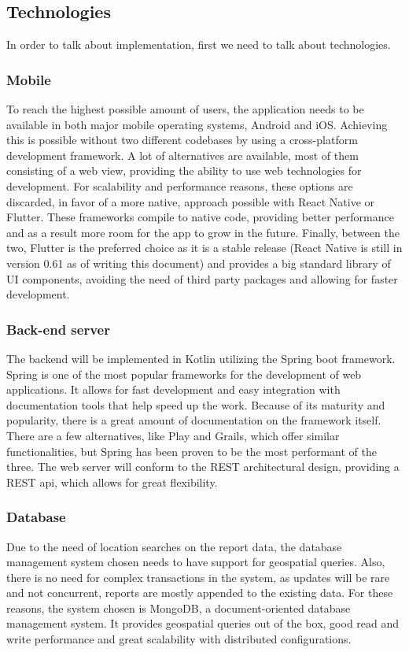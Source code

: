 \subsection{Technologies}
In order to talk about implementation, first we need to talk about technologies.

\subsubsection{Mobile}
To reach the highest possible amount of users, the application needs to be available in both major mobile operating systems, Android and iOS. Achieving this is possible without two different codebases by using a cross-platform development framework. A lot of alternatives are available, most of them consisting of a web view, providing the ability to use web technologies for development. For scalability and performance reasons, these options are discarded, in favor of a more native, approach possible with React Native or Flutter. These frameworks compile to native code, providing better performance and as a result more room for the app to grow in the future. Finally, between the two, Flutter is the preferred choice as it is a stable release (React Native is still in version 0.61 as of writing this document) and provides a big standard library of UI components, avoiding the need of third party packages and allowing for faster development.

\subsubsection{Back-end server}
The backend will be implemented in Kotlin utilizing the Spring boot framework. Spring is one of the most popular frameworks for the development of web applications. It allows for fast development and easy integration with documentation tools that help speed up the work. Because of its maturity and popularity, there is a great amount of documentation on the framework itself. There are a few alternatives, like Play and Grails, which offer similar functionalities, but Spring has been proven to be the most performant of the three.
The web server will conform to the REST architectural design, providing a REST api, which allows for great flexibility.

\subsubsection{Database}
Due to the need of location searches on the report data, the database management system chosen needs to have support for geospatial queries. Also, there is no need for complex transactions in the system, as updates will be rare and not concurrent, reports are mostly appended to the existing data.
For these reasons, the system chosen is MongoDB, a document-oriented database management system. It provides geospatial queries out of the box, good read and write performance and great scalability with distributed configurations. 

